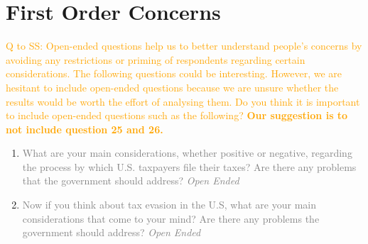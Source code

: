 \documentclass[11pt]{article}
\newcommand{\tk}[1]{\textcolor{orange}{#1}}
\begin{document}
\section*{First Order Concerns}
\tk{Q to SS: Open-ended questions help us to better understand people's concerns by avoiding any restrictions or priming of respondents regarding certain considerations. The following questions could be interesting. However, we are hesitant to include open-ended questions because we are unsure whether the results would be worth the effort of analysing them. Do you think it is important to include open-ended questions such as the following? \textbf{Our suggestion is to not include question 25 and 26.}}
\begin{enumerate}[resume]
    \item[\sout{\theenumi.}] \textcolor{gray}{What are your main considerations, whether positive or negative, regarding the process by which U.S. taxpayers file their taxes? Are there any problems that the government should address?
    \textit{Open Ended}}
    \item[\sout{\theenumi.}] \textcolor{gray}{Now if you think about tax evasion in the U.S, what are your main considerations that come to your mind? Are there any problems the government should address?
    \textit{Open Ended}}
\end{enumerate}
\end{document}
